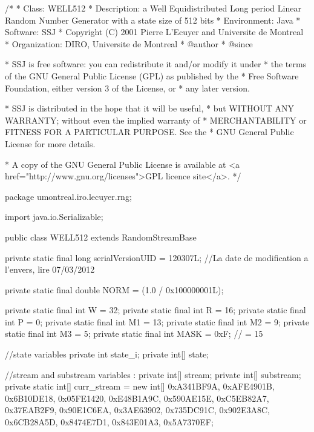 \begin{code}
\begin{hide}
/*
 * Class:        WELL512
 * Description:  a Well Equidistributed Long period Linear Random Number
                 Generator with a state size of 512 bits
 * Environment:  Java
 * Software:     SSJ
 * Copyright (C) 2001  Pierre L'Ecuyer and Universite de Montreal
 * Organization: DIRO, Universite de Montreal
 * @author
 * @since

 * SSJ is free software: you can redistribute it and/or modify it under
 * the terms of the GNU General Public License (GPL) as published by the
 * Free Software Foundation, either version 3 of the License, or
 * any later version.

 * SSJ is distributed in the hope that it will be useful,
 * but WITHOUT ANY WARRANTY; without even the implied warranty of
 * MERCHANTABILITY or FITNESS FOR A PARTICULAR PURPOSE.  See the
 * GNU General Public License for more details.

 * A copy of the GNU General Public License is available at
   <a href="http://www.gnu.org/licenses">GPL licence site</a>.
 */
\end{hide}
package umontreal.iro.lecuyer.rng; \begin{hide}

import java.io.Serializable;
\end{hide}

public class WELL512 extends RandomStreamBase \begin{hide} {

   private static final long serialVersionUID = 120307L;
   //La date de modification a l'envers, lire 07/03/2012

   private static final double NORM = (1.0 / 0x100000001L);

   private static final int W = 32;
   private static final int R = 16;
   private static final int P = 0;
   private static final int M1 = 13;
   private static final int M2 = 9;
   private static final int M3 = 5;
   private static final int MASK = 0xF;    // = 15

   //state variables
   private int state_i;
   private int[] state;

   //stream and substream variables :
   private int[] stream;
   private int[] substream;
   private static int[] curr_stream = new int[]
                              {0xA341BF9A, 0xAFE4901B, 0x6B10DE18, 0x05FE1420,
                               0xE48B1A9C, 0x590AE15E, 0xC5EB82A7, 0x37EAB2F9,
                               0x90E1C6EA, 0x3AE63902, 0x735DC91C, 0x902E3A8C,
                               0x6CB28A5D, 0x8474E7D1, 0x843E01A3, 0x5A7370EF};

}
\end{hide}
\end{code}
